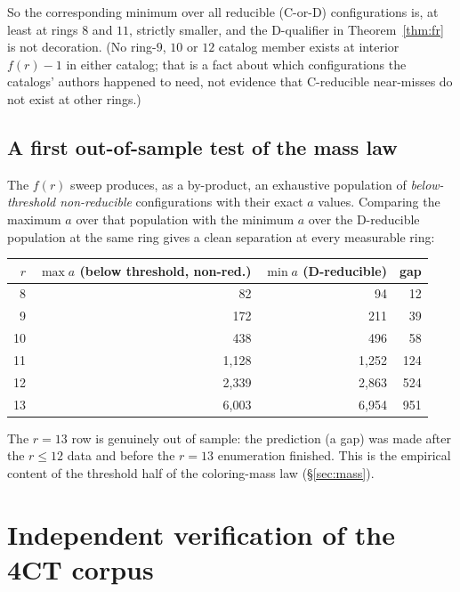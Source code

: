 \documentclass[11pt]{article}
\theoremstyle{definition}
\begin{document}
So the corresponding minimum over all reducible (C-or-D) configurations is, at least
at rings $8$ and $11$, strictly smaller, and the D-qualifier in
Theorem~\ref{thm:fr} is not decoration. (No ring-$9$, $10$ or $12$ catalog member
exists at interior $f(r)-1$ in either catalog; that is a fact about which
configurations the catalogs' authors happened to need, not evidence that C-reducible
near-misses do not exist at other rings.)

\subsection{A first out-of-sample test of the mass law}
\label{sec:gap}

The $f(r)$ sweep produces, as a by-product, an exhaustive population of
\emph{below-threshold non-reducible} configurations with their exact $a$ values.
Comparing the maximum $a$ over that population with the minimum $a$ over the
D-reducible population at the same ring gives a clean separation at every measurable
ring:

\begin{center}\small
\begin{tabular}{rrrr}
\toprule
$r$ & $\max a$ (below threshold, non-red.) & $\min a$ (D-reducible) & gap \\
\midrule
8  & 82      & 94      & 12 \\
9  & 172     & 211     & 39 \\
10 & 438     & 496     & 58 \\
11 & 1{,}128 & 1{,}252 & 124 \\
12 & 2{,}339 & 2{,}863 & 524 \\
13 & 6{,}003 & 6{,}954 & 951 \\
\bottomrule
\end{tabular}
\end{center}

The $r=13$ row is genuinely out of sample: the prediction (a gap) was made after the
$r\le12$ data and before the $r=13$ enumeration finished. This is the empirical
content of the threshold half of the coloring-mass law (\S\ref{sec:mass}).

\section{Independent verification of the 4CT corpus}
\label{sec:verify}
\end{document}
